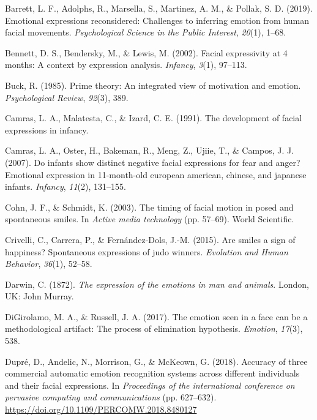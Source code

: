 \documentclass[man]{apa6}
\begin{document}
\begingroup
\setlength{\parindent}{-0.5in}
\setlength{\leftskip}{0.5in}

\hypertarget{refs}{}
\leavevmode\hypertarget{ref-barrett2019emotional}{}%
Barrett, L. F., Adolphs, R., Marsella, S., Martinez, A. M., \& Pollak, S. D. (2019). Emotional expressions reconsidered: Challenges to inferring emotion from human facial movements. \emph{Psychological Science in the Public Interest}, \emph{20}(1), 1--68.

\leavevmode\hypertarget{ref-bennett2002facial}{}%
Bennett, D. S., Bendersky, M., \& Lewis, M. (2002). Facial expressivity at 4 months: A context by expression analysis. \emph{Infancy}, \emph{3}(1), 97--113.

\leavevmode\hypertarget{ref-buck1985prime}{}%
Buck, R. (1985). Prime theory: An integrated view of motivation and emotion. \emph{Psychological Review}, \emph{92}(3), 389.

\leavevmode\hypertarget{ref-camras1991development}{}%
Camras, L. A., Malatesta, C., \& Izard, C. E. (1991). The development of facial expressions in infancy.

\leavevmode\hypertarget{ref-camras2007infants}{}%
Camras, L. A., Oster, H., Bakeman, R., Meng, Z., Ujiie, T., \& Campos, J. J. (2007). Do infants show distinct negative facial expressions for fear and anger? Emotional expression in 11-month-old european american, chinese, and japanese infants. \emph{Infancy}, \emph{11}(2), 131--155.

\leavevmode\hypertarget{ref-cohn2003timing}{}%
Cohn, J. F., \& Schmidt, K. (2003). The timing of facial motion in posed and spontaneous smiles. In \emph{Active media technology} (pp. 57--69). World Scientific.

\leavevmode\hypertarget{ref-crivelli2015smiles}{}%
Crivelli, C., Carrera, P., \& Fernández-Dols, J.-M. (2015). Are smiles a sign of happiness? Spontaneous expressions of judo winners. \emph{Evolution and Human Behavior}, \emph{36}(1), 52--58.

\leavevmode\hypertarget{ref-darwin1872expression}{}%
Darwin, C. (1872). \emph{The expression of the emotions in man and animals}. London, UK: John Murray.

\leavevmode\hypertarget{ref-digirolamo2017emotion}{}%
DiGirolamo, M. A., \& Russell, J. A. (2017). The emotion seen in a face can be a methodological artifact: The process of elimination hypothesis. \emph{Emotion}, \emph{17}(3), 538.

\leavevmode\hypertarget{ref-dupre2018accuracy}{}%
Dupré, D., Andelic, N., Morrison, G., \& McKeown, G. (2018). Accuracy of three commercial automatic emotion recognition systems across different individuals and their facial expressions. In \emph{Proceedings of the international conference on pervasive computing and communications} (pp. 627--632). \url{https://doi.org/10.1109/PERCOMW.2018.8480127}
\end{document}
